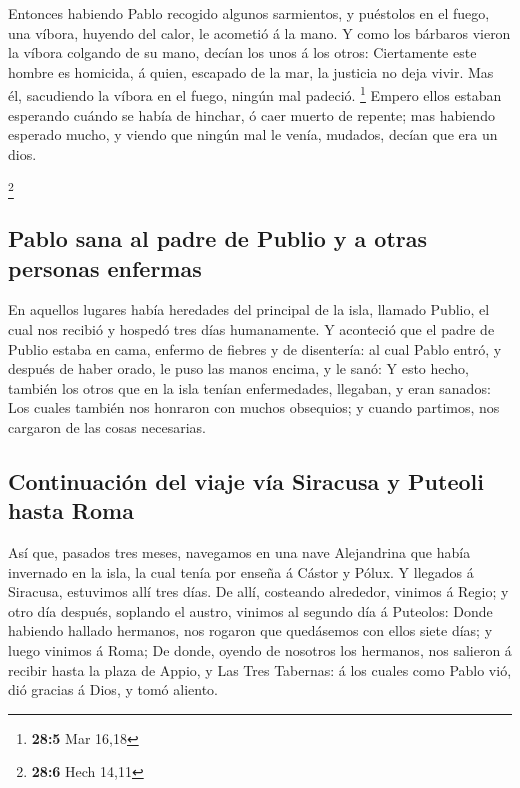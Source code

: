  Entonces habiendo Pablo recogido algunos sarmientos, y
puéstolos en el fuego, una víbora, huyendo del calor, le acometió á la
mano.  Y como los bárbaros vieron la víbora colgando de su
mano, decían los unos á los otros: Ciertamente este hombre es homicida,
á quien, escapado de la mar, la justicia no deja vivir. 
Mas él, sacudiendo la víbora en el fuego, ningún mal padeció.
\footnote{\textbf{28:5} Mar 16,18}  Empero ellos estaban
esperando cuándo se había de hinchar, ó caer muerto de repente; mas
habiendo esperado mucho, y viendo que ningún mal le venía, mudados,
decían que era un dios.

\footnote{\textbf{28:6} Hech 14,11}

\hypertarget{pablo-sana-al-padre-de-publio-y-a-otras-personas-enfermas}{%
\subsection{Pablo sana al padre de Publio y a otras personas
enfermas}\label{pablo-sana-al-padre-de-publio-y-a-otras-personas-enfermas}}

 En aquellos lugares había heredades del principal de la
isla, llamado Publio, el cual nos recibió y hospedó tres días
humanamente.  Y aconteció que el padre de Publio estaba en
cama, enfermo de fiebres y de disentería: al cual Pablo entró, y después
de haber orado, le puso las manos encima, y le sanó:  Y
esto hecho, también los otros que en la isla tenían enfermedades,
llegaban, y eran sanados:  Los cuales también nos
honraron con muchos obsequios; y cuando partimos, nos cargaron de las
cosas necesarias.

\hypertarget{continuaciuxf3n-del-viaje-vuxeda-siracusa-y-puteoli-hasta-roma}{%
\subsection{Continuación del viaje vía Siracusa y Puteoli hasta
Roma}\label{continuaciuxf3n-del-viaje-vuxeda-siracusa-y-puteoli-hasta-roma}}

 Así que, pasados tres meses, navegamos en una nave
Alejandrina que había invernado en la isla, la cual tenía por enseña á
Cástor y Pólux.  Y llegados á Siracusa, estuvimos allí
tres días.  De allí, costeando alrededor, vinimos á
Regio; y otro día después, soplando el austro, vinimos al segundo día á
Puteolos:  Donde habiendo hallado hermanos, nos rogaron
que quedásemos con ellos siete días; y luego vinimos á Roma;
 De donde, oyendo de nosotros los hermanos, nos salieron
á recibir hasta la plaza de Appio, y Las Tres Tabernas: á los cuales
como Pablo vió, dió gracias á Dios, y tomó aliento.

